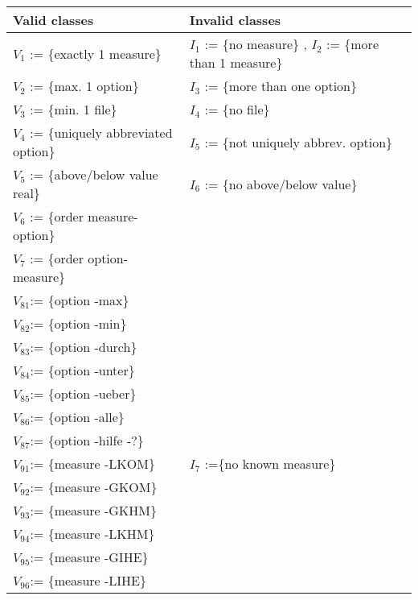 \begin{tabular}{l|l}
Valid classes	         		& Invalid classes \\ \hline
$V_1$ := \{exactly 1 measure\} 		& $I_1$ := \{no measure\} , $I_2$ := \{more than 1 measure\} \\
$V_2$ := \{max. 1 option\}              & $I_3$ := \{more than one option\} \\
$V_3$ := \{min. 1 file\}              	& $I_4$ := \{no file\} \\
$V_4$ := \{uniquely abbreviated option\}& $I_5$ := \{not uniquely abbrev. option\} \\
$V_5$ := \{above/below value real\}     & $I_6$ := \{no above/below value\} \\
$V_6$ := \{order measure-option\}	&                                   \\
$V_7$ := \{order option-measure\}	&                                   \\
$V_{81}$:= \{option -max\}              &                                   \\
$V_{82}$:= \{option -min\}              &                                   \\
$V_{83}$:= \{option -durch\}            &                                   \\
$V_{84}$:= \{option -unter\}            &                                   \\
$V_{85}$:= \{option -ueber\}            &                                   \\
$V_{86}$:= \{option -alle\}             &                                   \\
$V_{87}$:= \{option -hilfe -?\}         &                                   \\
$V_{91}$:= \{measure -LKOM\}		& $I_7$ :=\{no known measure\}   \\
$V_{92}$:= \{measure -GKOM\}            &                                   \\
$V_{93}$:= \{measure -GKHM\}            &                                   \\
$V_{94}$:= \{measure -LKHM\}            &                                   \\
$V_{95}$:= \{measure -GIHE\}            &                                   \\
$V_{96}$:= \{measure -LIHE\}            &                                   \\
\end{tabular}


